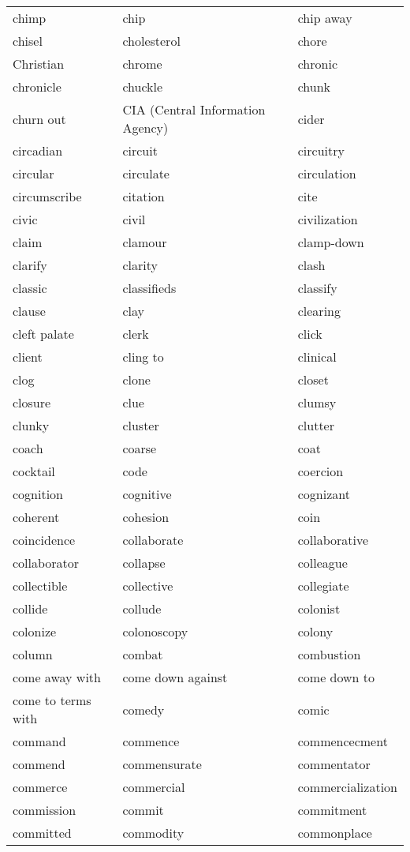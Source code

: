 \documentclass{minimal}
\begin{document}
\begin{longtable}{p{2.8cm}p{2.8cm}p{2.8cm}}
chimp & chip & chip away \\
chisel & cholesterol & chore \\
Christian & chrome & chronic \\
chronicle & chuckle & chunk \\
churn out & CIA (Central Information Agency) & cider \\
circadian & circuit & circuitry \\
circular & circulate & circulation \\
circumscribe & citation & cite \\
civic & civil & civilization \\
claim & clamour & clamp-down \\
clarify & clarity & clash \\
classic & classifieds & classify \\
clause & clay & clearing \\
cleft palate & clerk & click \\
client & cling to & clinical \\
clog & clone & closet \\
closure & clue & clumsy \\
clunky & cluster & clutter \\
coach & coarse & coat \\
cocktail & code & coercion \\
cognition & cognitive & cognizant \\
coherent & cohesion & coin \\
coincidence & collaborate & collaborative \\
collaborator & collapse & colleague \\
collectible & collective & collegiate \\
collide & collude & colonist \\
colonize & colonoscopy & colony \\
column & combat & combustion \\
come away with & come down against & come down to \\
come to terms with & comedy & comic \\
command & commence & commencecment \\
commend & commensurate & commentator \\
commerce & commercial & commercialization \\
commission & commit & commitment \\
committed & commodity & commonplace \\

\end{longtable}
\end{document}
